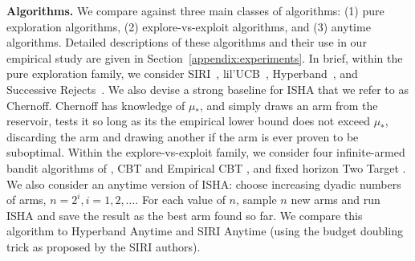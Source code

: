

\textbf{Algorithms.}
We compare against three main
classes of algorithms: (1) pure exploration algorithms, (2)
explore-vs-exploit algorithms, and (3) anytime algorithms.  Detailed
descriptions of these algorithms and their use in our empirical study
are given in Section~\ref{appendix:experiments}.  In brief, within
the pure exploration family, we consider
SIRI~\citep{DBLP:journals/corr/CarpentierV15},
lil'UCB~\citep{Jamieson2014lilU}, Hyperband~\citep{li2017hyperband},
and Successive Rejects~\citep{audibert2010best}.  We also devise a
strong baseline for ISHA that we refer to as Chernoff.
Chernoff has knowledge of $\mu_*$, and simply draws an arm from the
reservoir, tests it so long as its the empirical lower bound does not
exceed $\mu_*$, discarding the arm and drawing another if the arm is
ever proven to be suboptimal.  Within the explore-vs-exploit family,
we consider four infinite-armed bandit algorithms of \cite{berry1997}, CBT
and Empirical CBT \citep{Chan2018Infinite}, and fixed horizon Two
Target \citep{bonald2013two}.  We also consider an anytime version of ISHA:
choose increasing dyadic numbers of arms, $n=2^i, i=1,2,\dots$.  For each value of $n$,
sample $n$ new arms and run ISHA and save the result as the best arm found so far.  We compare this
algorithm to Hyperband Anytime and SIRI Anytime (using the budget
doubling trick as proposed by the SIRI authors).

